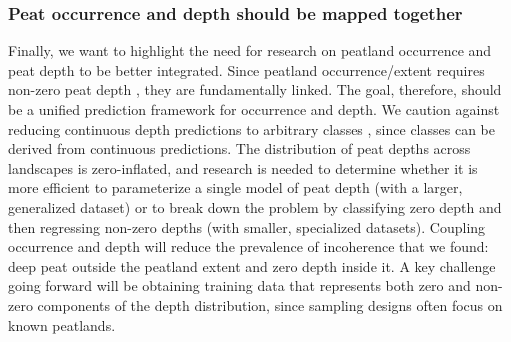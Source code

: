 \documentclass[soil, manuscript]{copernicus}
\begin{document}
\subsubsection{Peat occurrence and depth should be mapped together}

Finally, we want to highlight the need for research on peatland occurrence and peat depth to be better integrated.
Since peatland occurrence/extent requires non-zero peat depth \citep[the specific threshold varies by definition,][]{minasnyMappingMonitoringPeatland2023}, they are fundamentally linked.
The goal, therefore, should be a unified prediction framework for occurrence and depth.
We caution against reducing continuous depth predictions to arbitrary classes \citep[as in][]{ivanovsModelingGeospatialDistribution2024, karjalainenComparisonTwoGammaray2024}, since classes can be derived from continuous predictions.
The distribution of peat depths across landscapes is zero-inflated, and research is needed to determine whether it is more efficient to parameterize a single model of peat depth (with a larger, generalized dataset) or to break down the problem by classifying zero depth and then regressing non-zero depths (with smaller, specialized datasets).
Coupling occurrence and depth will reduce the prevalence of incoherence that we found: deep peat outside the peatland extent and zero depth inside it.
A key challenge going forward will be obtaining training data that represents both zero and non-zero components of the depth distribution, since sampling designs often focus on known peatlands.








\end{document}
